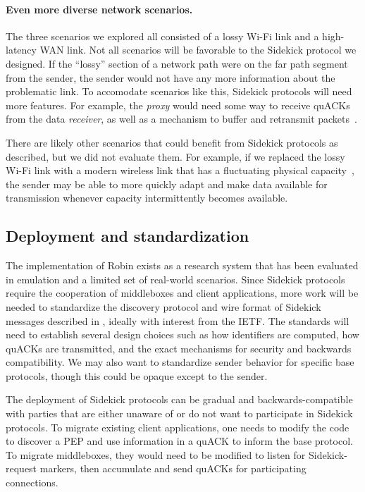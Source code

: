 \paragraph{Even more diverse network scenarios.}
The three scenarios we explored all consisted of a lossy Wi-Fi link and a
high-latency WAN link. Not all scenarios will be favorable to the
Sidekick protocol we designed.
If the ``lossy'' section of a network path were on the far path segment from the
sender, the sender would not have any more information about the problematic
link. To accomodate scenarios like this, Sidekick protocols will need
more features. For example, the \emph{proxy} would need some way to receive
quACKs from the data \emph{receiver}, as well as a mechanism to buffer and
retransmit packets~\cite{balakrishnan1995snoop,caini2006pepsal}.

There are likely other scenarios that could benefit from Sidekick protocols as
described, but we did not evaluate them. For example, if we replaced the lossy Wi-Fi
link with a modern wireless link that has a fluctuating physical
capacity~\cite{niu2015survey,burchardt2014vlc,koenig2013wireless},
the sender may be able to more quickly adapt and make
data available for transmission whenever capacity intermittently becomes available.

\subsection{Deployment and standardization}

The implementation of Robin exists as a research system that has been evaluated
in emulation and a limited set of real-world scenarios. Since Sidekick protocols
require the cooperation of middleboxes and client applications, more work will
be needed to standardize the discovery protocol and wire format of Sidekick messages
described in , ideally with interest from the IETF.
The standards will need to establish several design choices such as how
identifiers are computed, how quACKs are transmitted, and the exact mechanisms
for security and backwards compatibility.
We may also want to standardize sender behavior for specific base protocols,
though this could be opaque except to the sender.

The deployment of Sidekick protocols can be gradual and backwards-compatible
with parties that are either unaware of or do not want to participate in Sidekick
protocols.
To migrate existing client applications, one needs to modify the code to
discover a PEP and use information in a quACK to inform the base protocol.
To migrate middleboxes, they would need to be modified to listen for
Sidekick-request markers, then accumulate and send quACKs for participating
connections.

